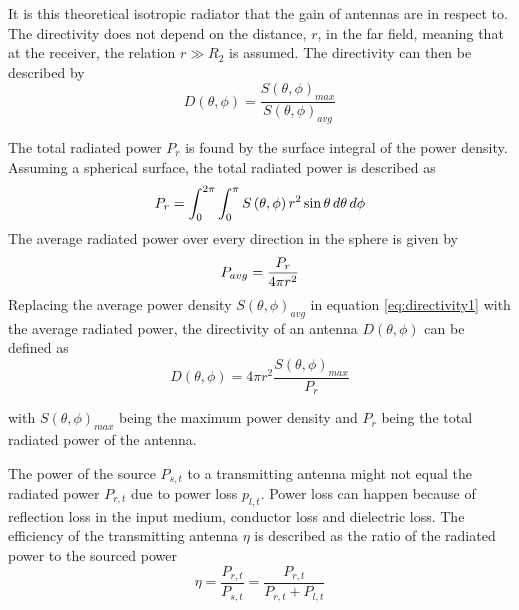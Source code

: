 It is this theoretical isotropic radiator that the gain of antennas are in respect to. The directivity does not depend on the distance, $r$, in the far field, meaning that at the receiver, the relation $r \gg  R_2$ is assumed. The directivity can then be described by~\cite[p. 10]{ant_beam_form}
\begin{equation} \label{eq:directivity1}
    D \left( \theta, \phi \right) = \frac{S\left( \theta, \phi \right)_{max}}{S\left( \theta, \phi \right)_{avg}}
\end{equation}

The total radiated power $P_{r}$ is found by the surface integral of the power density. Assuming a spherical surface, the total radiated power is described as~\cite[p. 1-9]{ant_eng_hk}
\begin{equation} \label{eq:surface_integral}
    P_{r} = \int_{0}^{2 \pi} \int_{0}^{\pi} S\left( \theta, \phi \right) r^2 \sin \theta \, d\theta \, d\phi
    \tagaddtext{[\si{\watt}]}
\end{equation}
The average radiated power over every direction in the sphere is given by~\cite[p. 1-9]{ant_eng_hk}
\begin{equation} \label{eq:average_power}
    P_{avg} = \frac{P_{r}}{4 \pi r^2}
    \tagaddtext{[\si{\watt\per\meter\squared}]}
\end{equation}
Replacing the average power density $S\left( \theta, \phi \right)_{avg}$ in equation \ref{eq:directivity1} with the average radiated power, the directivity of an antenna $D \left(\theta, \phi \right)$ can be defined as~\cite[p. 10]{ant_beam_form}
\begin{equation} \label{eq:directivity}
    D\left(\theta, \phi\right) = 4 \pi r^2 \frac{S \left(\theta, \phi\right)_{max}}{P_{r}}
\end{equation}

with $S\left(\theta, \phi\right)_{max}$ being the maximum power density and $P_{r}$ being the total radiated power of the antenna.

The power of the source $P_{s,t}$ to a transmitting antenna might not equal the radiated power $P_{r,t}$ due to power loss $p_{l,t}$. Power loss can happen because of reflection loss in the input medium, conductor loss and dielectric loss. The efficiency of the transmitting antenna $\eta$ is described as the ratio of the radiated power to the sourced power 
\begin{equation} \label{eq:antenna_efficiency}
    \eta = \frac{P_{r,t}}{P_{s,t}} = \frac{P_{r,t}}{P_{r,t}+P_{l,t}}
\end{equation}

